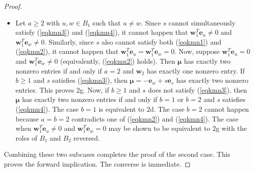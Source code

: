 \documentclass[10pt,a4paper]{amsart}
\newcommand{\be}{\mathbf e}
\newcommand{\bmu}{{\boldsymbol{\mu}}}
\newcommand{\bw}{\mathbf w}
\begin{document}
\begin{proof}
\begin{itemize}
\begin{itemize}
\end{itemize}
\item Let $a\geq 2$ with $u,w\in B_1$ such that $u\neq w$. Since $s$ cannot simultaneously satisfy (\ref{eqkmn3}) and (\ref{eqkmn4}), it cannot happen that $\bw_1^T\be_u\neq 0$ and $\bw_1^T\be_w\neq 0$. Similarly, since $s$ also cannot satisfy both (\ref{eqkmn1}) and (\ref{eqkmn2}), it cannot happen that $\bw_1^T\be_u=\bw_1^T\be_w=0$. Now, suppose $\bw_1^T\be_u=0$ and $\bw_1^T\be_w\neq 0$ (equivalently, (\ref{eqkmn2}) holds). Then $\bmu$ has exactly two nonzero entries if and only if $a=2$ and $\bw_2$ has exactly one nonzero entry. If $b\geq 1$ and $s$ satisfies (\ref{eqkmn3}), then $\bmu=-\be_w+s\be_v$ has exactly two nonzero entries. This proves 2g. Now, if $b\geq 1$ and $s$ does not satisfy (\ref{eqkmn3}), then $\bmu$ has exactly two nonzero entries if and only if $b=1$ or $b=2$ and $s$ satisfies (\ref{eqkmn4}). The case $b=1$ is equivalent to 2d. The case $b=2$ cannot happen because $a=b=2$ contradicts one of (\ref{eqkmn2}) and (\ref{eqkmn4}).
The case when $\bw_1^T\be_u\neq 0$ and $\bw_1^T\be_w=0$ may be shown to be equivalent to 2g with the roles of $B_1$ and $B_2$ reversed.
\end{itemize}
Combining these two subcases completes the proof of the second case. This proves the forward implication. The converse is immediate.
\end{proof}
\end{document}
